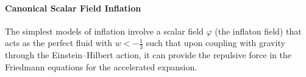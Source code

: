 \documentclass[aps,prd,reprint,preprintnumbers,showpacs,floatfix,nofootinbib,superscript address]{revtex4-2}
\newcommand{\wb}[1]{{\color[RGB]{255,0,0}{\textbf{\textit{[WB: #1]}}}}}
\begin{document}
\paragraph{Canonical Scalar Field Inflation} \label{Canonical Scalar Field Inflation}
The simplest models of inflation involve a scalar field $\varphi$ (the inflaton field) that acts as the perfect fluid with $w < -\frac{1}{3}$ such that upon coupling with gravity through the Einstein--Hilbert action, it can provide the repulsive force in the Friedmann equations for the accelerated expansion.

\end{document}
